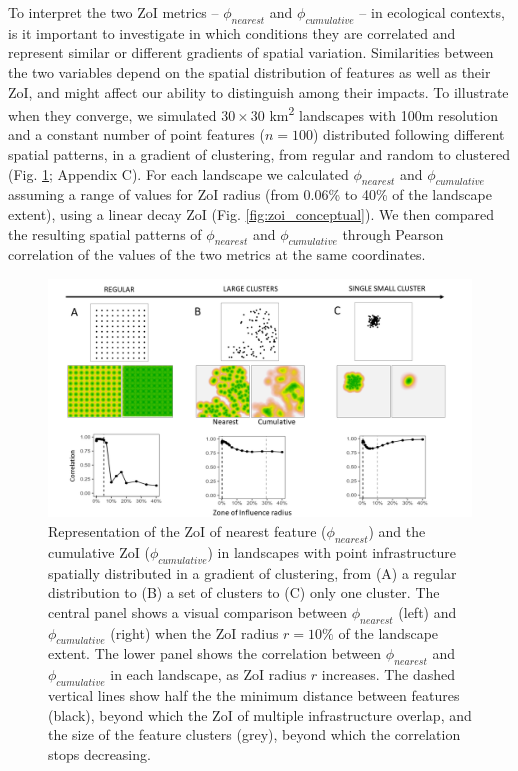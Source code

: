 \documentclass[titlepage]{article}
\begin{document}
To interpret the two ZoI metrics -- $\phi_{nearest}$ and $\phi_{cumulative}$ -- in ecological contexts, is it important to investigate in which conditions they are correlated and represent similar or different gradients of spatial variation. Similarities between the two variables depend on the spatial distribution of features as well as their ZoI, and might affect our ability to distinguish among their impacts. To illustrate when they converge, we simulated $30 \times 30$ km\textsuperscript{2} landscapes with 100m resolution and a constant number of point features ($n = 100$) distributed following different spatial patterns, in a gradient of clustering, from regular and random to clustered (Fig. \ref{fig:simulated_landscapes}; Appendix C). For each landscape we calculated $\phi_{nearest}$ and $\phi_{cumulative}$ assuming a range of values for ZoI radius (from 0.06\% to 40\% of the landscape extent), using a linear decay ZoI (Fig. \ref{fig:zoi_conceptual}). We then compared the resulting spatial patterns of $\phi_{nearest}$ and $\phi_{cumulative}$ through Pearson correlation of the values of the two metrics at the same coordinates. 

\begin{figure}[h]
\centering
\includegraphics[width=1.3\textwidth,center]{figures/simulated_landscapes.png}
\caption{\label{fig:simulated_landscapes} Representation of the ZoI of nearest feature ($\phi_{nearest}$) and the cumulative ZoI ($\phi_{cumulative}$) in landscapes with point infrastructure spatially distributed in a gradient of clustering, from (A) a regular distribution to (B) a set of clusters to (C) only one cluster. 
The central panel shows a visual comparison between $\phi_{nearest}$ (left) and $\phi_{cumulative}$ (right) when the ZoI radius $r = 10\%$ of the landscape extent. The lower panel shows the correlation between $\phi_{nearest}$ and $\phi_{cumulative}$ in each landscape, as ZoI radius $r$ increases. The dashed vertical lines show half the the minimum distance between features (black), beyond which the ZoI of multiple infrastructure overlap, and the size of the feature clusters (grey), beyond which the correlation stops decreasing.}
\end{figure}
\end{document}
